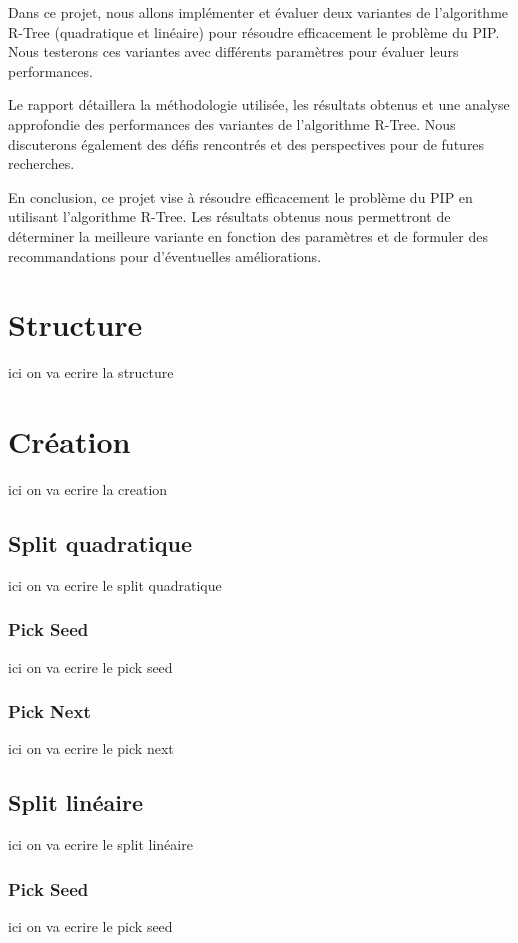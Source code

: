 \documentclass {article}
\begin{document}
Dans ce projet, nous allons implémenter et évaluer deux variantes de l'algorithme R-Tree (quadratique et linéaire) 
pour résoudre efficacement le problème du PIP. Nous testerons ces variantes avec différents paramètres pour 
évaluer leurs performances.

Le rapport détaillera la méthodologie utilisée, les résultats obtenus et une analyse approfondie des performances 
des variantes de l'algorithme R-Tree. Nous discuterons également des défis rencontrés et des perspectives pour de 
futures recherches.


En conclusion, ce projet vise à résoudre efficacement le problème du PIP en utilisant l'algorithme R-Tree. 
Les résultats obtenus nous permettront de déterminer la meilleure variante en fonction des paramètres et 
de formuler des recommandations pour d'éventuelles améliorations.

\section {Structure}
ici on va ecrire la structure
\section {Création}
ici on va ecrire la creation
\subsection {Split quadratique}
ici on va ecrire le split quadratique

\subsubsection {Pick Seed}
ici on va ecrire le pick seed

\subsubsection {Pick Next}
ici on va ecrire le pick next

\subsection {Split linéaire}
ici on va ecrire le split linéaire

\subsubsection {Pick Seed}
ici on va ecrire le pick seed
\end{document}
